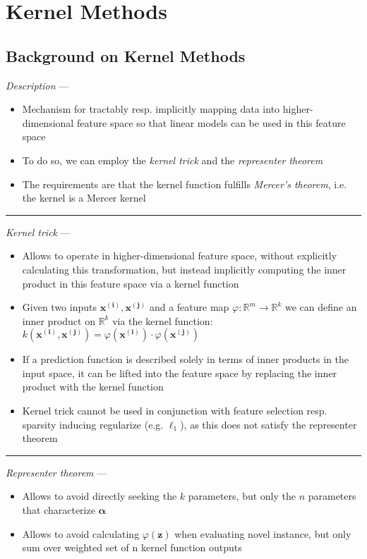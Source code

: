 \section{Kernel Methods}
\subsection*{Background on Kernel Methods}
\emph{Description} ---
\begin{itemize}
    \item Mechanism for tractably resp. implicitly mapping data into higher-dimensional feature space so that linear models can be used in this feature space
    \item To do so, we can employ the \emph{kernel trick} and the \emph{representer theorem}
    \item The requirements are that the kernel function fulfills \emph{Mercer's theorem}, i.e. the kernel is a Mercer kernel
\end{itemize}

{\color{lightgray}\hrule height 0.001mm}

\emph{Kernel trick} ---
\begin{itemize}
    \item Allows to operate in higher-dimensional feature space, without explicitly calculating this transformation, but instead implicitly computing the inner product in this feature space via a kernel function
    \item Given two inputs $\boldsymbol{x^{(i)}}, \boldsymbol{x^{(j)}}$ and a feature map $\varphi: \mathbb{R}^m \rightarrow \mathbb{R}^k$ we can define an inner product on $\mathbb{R}^k$ via the kernel function: $k(\boldsymbol{x^{(i)}}, \boldsymbol{x^{(j)}}) = \varphi(\boldsymbol{x^{(i)}}) \cdot \varphi(\boldsymbol{x^{(j)}})$
    \item If a prediction function is described solely in terms of inner products in the input space, it can be lifted into the feature space by replacing the inner product with the kernel function
    \item Kernel trick cannot be used in conjunction with feature selection resp. sparsity inducing regularize (e.g. $\ell_1$), as this does not satisfy the representer theorem
\end{itemize}

{\color{lightgray}\hrule height 0.001mm}

\emph{Representer theorem} ---
\begin{itemize}
    \item Allows to avoid directly seeking the $k$ parameters, but only the $n$ parameters that characterize $\boldsymbol{\alpha}$
    \item Allows to avoid calculating $\varphi({\boldsymbol{z}})$ when evaluating novel instance, but only sum over weighted set of n kernel function outputs
\end{itemize}

